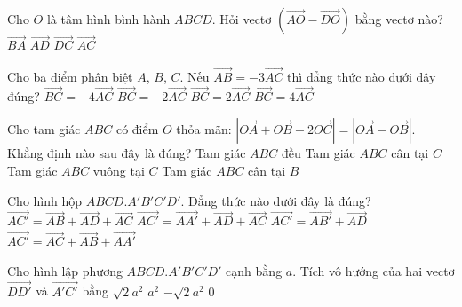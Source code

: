 \begin{ex}
	Cho $O$ là tâm hình bình hành $ABCD$. Hỏi vectơ $\left(\vec{AO}-\vec{DO}\right)$ bằng vectơ nào?
	\choice
	{$\vec{BA}$}
	{\True $\vec{AD}$}
	{$\vec{DC}$}
	{$\vec{AC}$}
\end{ex}
\begin{ex}
	Cho ba điểm phân biệt $A$, $B$, $C$. Nếu $\vec{AB}=-3\vec{AC}$ thì đẳng thức nào dưới đây đúng?
	\choice
	{$\vec{BC}=-4\vec{AC}$}
	{$\vec{BC}=-2\vec{AC}$}
	{$\vec{BC}=2\vec{AC}$}
	{\True $\vec{BC}=4\vec{AC}$}
\end{ex}
\begin{ex}
	Cho tam giác $ABC$ có điểm $O$ thỏa mãn: $\left| \vec{OA}+\vec{OB}-2\vec{OC} \right| = \left| \vec{OA}-\vec{OB} \right|$. Khẳng định nào sau đây là đúng?
	\choice
	{Tam giác $ABC$ đều}
	{Tam giác $ABC$ cân tại $C$}
	{\True Tam giác $ABC$ vuông tại $C$}
	{Tam giác $ABC$ cân tại $B$}
\end{ex}
\begin{ex}
	Cho hình hộp $ABCD.A'B'C'D'$. Đẳng thức nào dưới đây là đúng?
	\choice
	{$\vec{AC'}=\vec{AB}+\vec{AD}+\vec{AC}$}
	{$\vec{AC'}=\vec{AA'}+\vec{AD}+\vec{AC}$}
	{\True $\vec{AC'}=\vec{AB'}+\vec{AD}$}
	{$\vec{AC'}=\vec{AC}+\vec{AB}+\vec{AA'}$}
\end{ex}
\begin{ex}
	Cho hình lập phương $ABCD.A'B'C'D'$ cạnh bằng $a$. Tích vô hướng của hai vectơ $\vec{DD'}$ và $\vec{A'C'}$ bằng
	\choice
	{$\sqrt{2}a^2$}
	{$a^2$}
	{$-\sqrt{2}a^2$}
	{\True $0$}
\end{ex}

